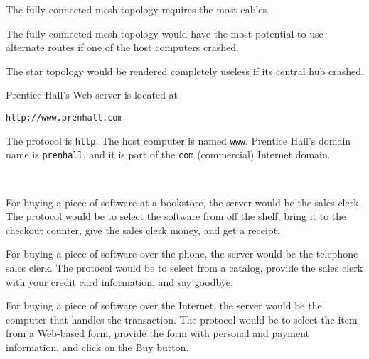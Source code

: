 \secANSH

\begin{ANS}
\item  The fully connected mesh topology requires the most cables.

\item  The fully connected mesh topology would have the most potential
to use alternate routes if one of the host computers crashed.

\item  The star topology would be rendered completely useless if
its central hub crashed.

\item  Prentice Hall's Web server is located at

\begin{jjjlisting}
\begin{lstlisting}[commentstyle=\color{black}]
http://www.prenhall.com 
\end{lstlisting}
\end{jjjlisting}

\noindent The protocol is {\tt http}. The host computer is named {\tt www}.
Prentice Hall's domain name is {\tt prenhall}, and it is part of the
{\tt com} (commercial) Internet domain.


\item  \mbox{ }
\begin{ANSBL}
\item  For buying a piece of software at a bookstore,
the server would be the sales clerk.  The protocol would
be to select the software from off the shelf, bring
it to the checkout counter, give the sales clerk 
money, and get a receipt.

\item  For buying a piece of software over the phone,
the server would be the telephone sales clerk.  The protocol would
be to select from a catalog, provide the sales clerk with
your credit card information, and say goodbye.

\item  For buying a piece of software over the Internet,
the server would be the computer that handles the transaction.  The
protocol would be to select the item from a Web-based form, provide
the form with personal and payment information, and click on the
Buy button.
\end{ANSBL}



\end{ANS}
